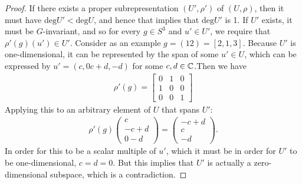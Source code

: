 \documentclass[num=4,duedate=03-03-21,course=Algebra\ II,proflastname=Walton]{hwtemplate}
\begin{document}
\begin{proof}
	If there exists a proper subrepresentation \((U',\rho')\) of \((U,\rho)\), then it must have \(\textrm{deg}U' < \textrm{deg}U\), and hence that implies that \(\textrm{deg}U'\) is 1. If \(U'\) exists, it must be \(G\)-invariant, and so for every \(g \in S^3\) and \(u' \in U'\), we require that \(\rho'(g)(u') \in U'\). Consider as an example \(g = (12) = [2,1,3]\). Because \(U'\) is one-dimensional, it can be represented by the span of some \(u' \in U\), which can be expressed by \(u' = (c,0c+d,-d)\) for some \(c,d \in \mathbb{C}\).Then we have
	\begin{align*}
		\rho'(g) = \begin{bmatrix} 0 & 1 & 0 \\ 1 & 0 & 0 \\ 0 & 0 & 1 \end{bmatrix} 
	\end{align*}
	Applying this to an arbitrary element of \(U\) that spans \(U'\):
	\begin{align*}
		\rho'(g) \begin{pmatrix} c \\ -c+d \\ 0-d \end{pmatrix} = \begin{pmatrix} -c+d \\ c \\ -d \end{pmatrix} .
	\end{align*}
	In order for this to be a scalar multiple of \(u'\), which it must be in order for \(U'\) to be one-dimensional, \(c=d=0\). But this implies that \(U'\) is actually a zero-dimensional subspace, which is a contradiction.
\end{proof}
\end{document}
